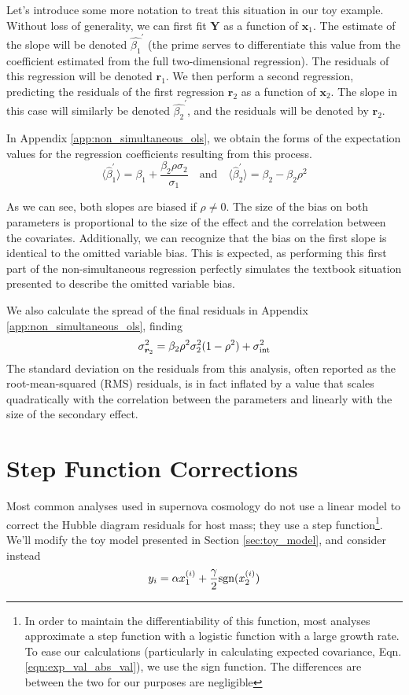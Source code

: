 Let's introduce some more notation to treat this situation in our toy example. Without loss of generality, we can first fit $\bm{Y}$ as a function of $\bm{x}_1$. The estimate of the slope will be denoted $\hat{\beta_1}^\prime$ (the prime serves to differentiate this value from the coefficient estimated from the full two-dimensional regression). The residuals of this regression will be denoted $\bm{r}_1$. We then perform a second regression, predicting the residuals of the first regression $\bm{r}_2$ as a function of $\bm{x}_2$. The slope in this case will similarly be denoted $\hat{\beta_2}^\prime$, and the residuals will be denoted by $\bm{r}_2$.

In Appendix \ref{app:non_simultaneous_ols}, we obtain the forms of the expectation values for the regression coefficients resulting from this process.
\begin{equation*}
    \langle\hat{\beta}_1^\prime\rangle = \beta_1 + \frac{\beta_2\rho\sigma_2}{\sigma_1}\quad\text{and}\quad\langle\hat{\beta}_2^\prime\rangle = \beta_2 - \beta_2\rho^2
\end{equation*}

As we can see, both slopes are biased if $\rho \neq 0$. The size of the bias on both parameters is proportional to the size of the effect and the correlation between the covariates. Additionally, we can recognize that the bias on the first slope is identical to the omitted variable bias. This is expected, as performing this first part of the non-simultaneous regression perfectly simulates the textbook situation presented to describe the omitted variable bias.

We also calculate the spread of the final residuals in Appendix \ref{app:non_simultaneous_ols}, finding
\begin{equation}
    \sigma_{\bm{r}_2}^2 = \beta_2\rho^2\sigma_2^2(1-\rho^2) + \sigma_{\text{int}}^2
\end{equation}
The standard deviation on the residuals from this analysis, often reported as the root-mean-squared (RMS) residuals, is in fact inflated by a value that scales quadratically with the correlation between the parameters and linearly with the size of the secondary effect.
\section{Step Function Corrections}
\label{sec:add_step}
Most common analyses used in supernova cosmology do not use a linear model to correct the Hubble diagram residuals for host mass; they use a step function\footnote{In order to maintain the differentiability of this function, most analyses approximate a step function with a logistic function with a large growth rate. To ease our calculations (particularly in calculating expected covariance, Eqn. \ref{eqn:exp_val_abs_val}), we use the sign function. The differences are between the two for our purposes are negligible}. We'll modify the toy model presented in Section \ref{sec:toy_model}, and consider instead
\begin{equation}
    y_i = \alpha x_1^{(i)} + \frac{\gamma}{2}\text{sgn}(x_2^{(i)})
\label{eqn:linear_and_step}
\end{equation}

